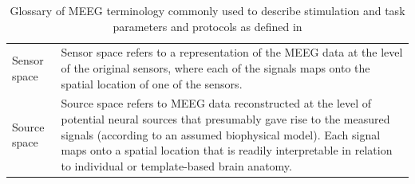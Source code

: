 \begin{table}[ht]
\begin{tabular}{@{}| p{3cm}|p{10cm}| @{}}
        Sensor space & Sensor space refers to a representation of the MEEG data at the level of the original sensors, where each of the signals maps onto the spatial location of one of the sensors.                                                                                                                                           \\
        Source space & Source space refers to MEEG data reconstructed at the level of potential neural sources that presumably gave rise to the measured signals (according to an assumed biophysical model). Each signal maps onto a spatial location that is readily interpretable in relation to individual or template-based brain anatomy. \\
        \hline
    \end{tabular}
    \caption{Glossary of MEEG terminology commonly used to describe stimulation and task parameters and protocols as defined in \cite{pernet2018best}}

    \label{Tab:Glossary_protocol}
\end{table}

